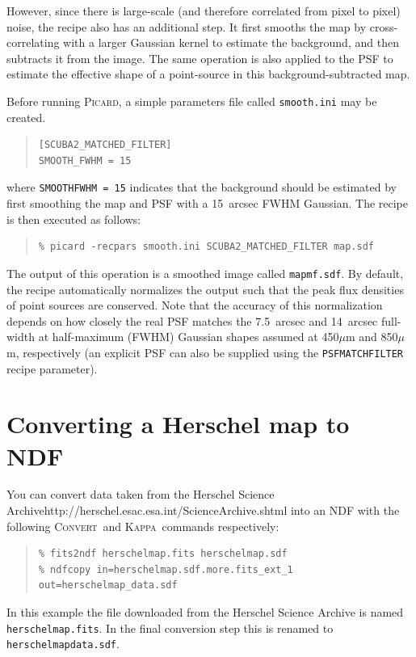 \documentclass[twoside,11pt]{article}
\newcommand{\xref}[3]{#1}
\newcommand{\xlabel}[1]{}
\renewcommand{\_}{\texttt{\symbol{95}}}
\newenvironment{myquote}{\begin{quote}\begin{small}}{\end{small}\end{quote}}
\newcommand{\convert}{\xref{\textsc{Convert}}{sun55}{}}
\newcommand{\Kappa}{\xref{\textsc{Kappa}}{sun95}{}}
\newcommand{\param}[1]{\texttt{#1}}
\begin{document}
However, since there is large-scale (and therefore correlated from
pixel to pixel) noise, the recipe also has an additional step. It
first smooths the map by cross-correlating with a larger Gaussian
kernel to estimate the background, and then subtracts it from the
image. The same operation is also applied to the PSF to estimate the
effective shape of a point-source in this background-subtracted map.

Before running \textsc{Picard}, a simple parameters file called \texttt{smooth.ini}
may be created.
\begin{myquote}
\begin{verbatim}
[SCUBA2_MATCHED_FILTER]
SMOOTH_FWHM = 15
\end{verbatim}
\end{myquote}
%
where \texttt{SMOOTH\_FWHM = 15} indicates that the background should
be estimated by first smoothing the map and PSF with a 15~arcsec FWHM
Gaussian. The recipe is then executed as follows:
%
\begin{myquote}
\begin{verbatim}
% picard -recpars smooth.ini SCUBA2_MATCHED_FILTER map.sdf
\end{verbatim}
\end{myquote}
%
The output of this operation is a smoothed image called
\texttt{map\_mf.sdf}. By default, the recipe automatically normalizes
the output such that the peak flux densities of point sources are
conserved. Note that the accuracy of this normalization depends on how
closely the real PSF matches the 7.5~arcsec and 14~arcsec full-width
at half-maximum (FWHM) Gaussian shapes assumed at 450$\mu$m and
850$\mu$m, respectively (an explicit PSF can also be supplied using
the \param{PSF\_MATCHFILTER} recipe parameter).

\newpage
\section{\xlabel{convert}Converting a Herschel map to NDF}
\label{app:convert}

You can convert data taken from the
{Herschel Science Archive}{http://herschel.esac.esa.int/Science\_Archive.shtml}
into an NDF with the following \convert\ and \Kappa\ commands respectively:

\begin{myquote}
\begin{verbatim}
% fits2ndf herschelmap.fits herschelmap.sdf
% ndfcopy in=herschelmap.sdf.more.fits_ext_1 out=herschelmap_data.sdf
\end{verbatim}
\end{myquote}
In this example the file downloaded from the Herschel Science Archive
is named \texttt{herschelmap.fits}. In the final conversion step this
is renamed to \texttt{herschelmap\_data.sdf}.
\end{document}
